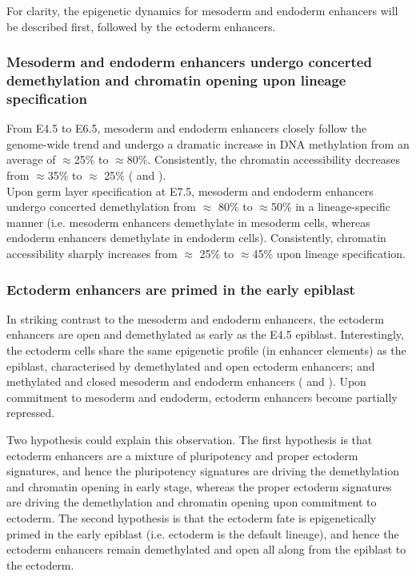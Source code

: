 For clarity, the epigenetic dynamics for mesoderm and endoderm enhancers will be described first, followed by the ectoderm enhancers.

\subsubsection{Mesoderm and endoderm enhancers undergo concerted demethylation and chromatin opening upon lineage specification}

From E4.5 to E6.5, mesoderm and endoderm enhancers closely follow the genome-wide trend and undergo a dramatic increase in DNA methylation from an average of $\approx$25\% to $\approx$80\%. Consistently, the chromatin accessibility decreases from $\approx$35\% to $\approx$ 25\% ( and ).\\
Upon germ layer specification at E7.5, mesoderm and endoderm enhancers undergo concerted demethylation from $\approx$ 80\% to $\approx$50\% in a lineage-specific manner (i.e. mesoderm enhancers demethylate in mesoderm cells, whereas endoderm enhancers demethylate in endoderm cells). Consistently, chromatin accessibility sharply increases from $\approx$ 25\% to $\approx$45\% upon lineage specification.



\subsubsection{Ectoderm enhancers are primed in the early epiblast}

In striking contrast to the mesoderm and endoderm enhancers, the ectoderm enhancers are open and demethylated as early as the E4.5 epiblast. Interestingly, the ectoderm cells share the same epigenetic profile (in enhancer elements) as the epiblast, characterised by demethylated and open ectoderm enhancers; and methylated and closed mesoderm and endoderm enhancers ( and ). Upon commitment to mesoderm and endoderm, ectoderm enhancers become partially repressed.

Two hypothesis could explain this observation. The first hypothesis is that ectoderm enhancers are a mixture of pluripotency and proper ectoderm signatures, and hence the pluripotency signatures are driving the demethylation and chromatin opening in early stage, whereas the proper ectoderm signatures are driving the demethylation and chromatin opening upon commitment to ectoderm. The second hypothesis is that the ectoderm fate is epigenetically primed in the early epiblast (i.e. ectoderm is the default lineage), and hence the ectoderm enhancers remain demethylated and open all along from the epiblast to the ectoderm.

